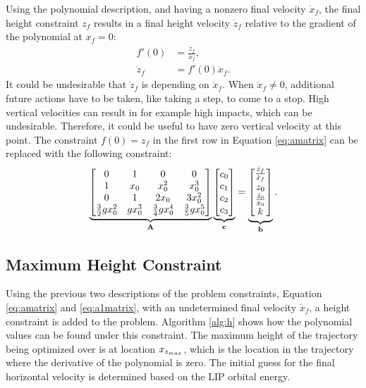 Using the polynomial description, and having a nonzero final velocity $\dot{x}_f$, the final height constraint $z_f$ results in a final height velocity $\dot{z}_f$ relative to the gradient of the polynomial at $x_f=0$:
\begin{align}
 	f'(0) &= \frac{\dot{z}_f}{\dot{x}_f},\\
 	\dot{z}_f &= f'(0)\dot{x}_f.
\end{align}
It could be undesirable that $\dot{z}_f$ is depending on $\dot{x}_f$. When $\dot{x}_f \neq 0$, additional future actions have to be taken, like taking a step, to come to a stop. High vertical velocities can result in for example high impacts, which can be undesirable. Therefore, it could be useful to have zero vertical velocity at this point. The constraint $f(0)=z_f$ in the first row in Equation \eqref{eq:amatrix} can be replaced with the following constraint:
\begin{equation}
    \underbrace{\begin{bmatrix}0 & 1 & 0 & 0 \\ 
     1 & x_0 & x_0^2 & x_0^3\\
     0 & 1 & 2x_0 & 3x_0^2\\
     \frac{3}{2}gx_0^2 & gx_0^3 & \frac{3}{4}gx_0^4 & \frac{3}{5}gx_0^5\\
     \end{bmatrix}}_{\mathbf{A}}
     \underbrace{\begin{bmatrix}
     c_0\\
     c_1\\
     c_2\\
     c_3\\
     \end{bmatrix}}_{\mathbf{c}}=
     \underbrace{\begin{bmatrix}
    \frac{\dot{z}_f}{\dot{x}_f}\\ 
     z_0\\
     \frac{\dot{z}_0}{\dot{x}_0}\\
     k\\
     \end{bmatrix}}_{\mathbf{b}}
     \label{eq:a1matrix}.
\end{equation}


\subsection{Maximum Height Constraint}
Using the previous two descriptions of the problem constraints, Equation \eqref{eq:amatrix} and \eqref{eq:a1matrix}, with an undetermined final velocity $\dot{x}_f$, a height constraint is added to the problem. Algorithm \ref{alg:h} shows how the polynomial values can be found under this constraint. The maximum height of the trajectory being optimized over is at location $x_{z_{max}}$, which is the location in the trajectory where the derivative of the polynomial is zero. The initial guess for the final horizontal velocity is determined based on the \ac{LIP} orbital energy. 

